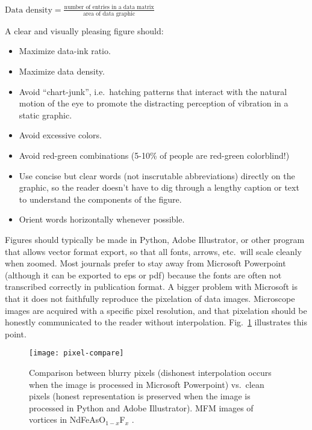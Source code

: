 \vspace{1mm}
\noindent $\displaystyle{\text{Data density} = \frac{\text{number of entries in a data matrix}}{\text{area of data graphic}}}$
\vspace{3mm}

\noindent A clear and visually pleasing figure should:
\begin{itemize}[label=$\Box$]
\item Maximize data-ink ratio.
\item Maximize data density.
\item Avoid ``chart-junk'', i.e.\ hatching patterns that interact with the natural motion of the eye to promote the distracting perception of vibration in a static graphic.
\item Avoid excessive colors.
\item Avoid red-green combinations (5-10\% of people are red-green colorblind!)
\item Use concise but clear words (not inscrutable abbreviations) directly on the graphic, so the reader doesn't have to dig through a lengthy caption or text to understand the components of the figure.
\item Orient words horizontally whenever possible.
\end{itemize}
\vspace{3mm}

 Figures should typically be made in Python, Adobe Illustrator, or other program that allows vector format export, so that all fonts, arrows, etc.\ will scale cleanly when zoomed. Most journals prefer to stay away from Microsoft Powerpoint (although it can be exported to eps or pdf) because the fonts are often not transcribed correctly in publication format. A bigger problem with Microsoft is that it does not faithfully reproduce the pixelation of data images. Microscope images are acquired with a specific pixel resolution, and that pixelation should be honestly communicated to the reader without interpolation. Fig.\ \ref{fig:pixels} illustrates this point.

\begin{figure}[h]
    \texttt{[image: pixel-compare]}
    \caption{Comparison between blurry pixels (dishonest interpolation occurs when the image is processed in Microsoft Powerpoint) vs.\ clean pixels (honest representation is preserved when the image is processed in Python and Adobe Illustrator). MFM images of vortices in NdFeAsO$_{1-x}$F$_x$ \cite{ZhangPRB2015}.}
     \label{fig:pixels}
\end{figure}

